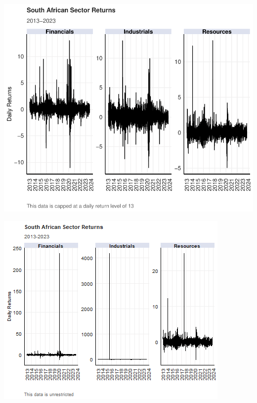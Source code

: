 \documentclass[11pt,preprint, authoryear]{elsarticle}
\let\origfigure\figure
\let\endorigfigure\endfigure
\renewenvironment{figure}[1][2] {
    \expandafter\origfigure\expandafter[H]
} {
    \endorigfigure
}
\numberwithin{equation}{section}
\numberwithin{figure}{section}
\numberwithin{table}{section}
\begin{document}
\begin{figure}[H]

{\centering \includegraphics{Essay_files/figure-latex/Figure1-1} 

}

\caption{Cumulative Sector Returns (restricted data set) \label{Figure1}}\label{fig:Figure1}
\end{figure}

\begin{figure}[H]

{\centering \includegraphics{Essay_files/figure-latex/Figure2-1} 

}

\caption{Cumulative Sector Returns (unrestricted data set) \label{Figure2}}\label{fig:Figure2}
\end{figure}
\end{document}
